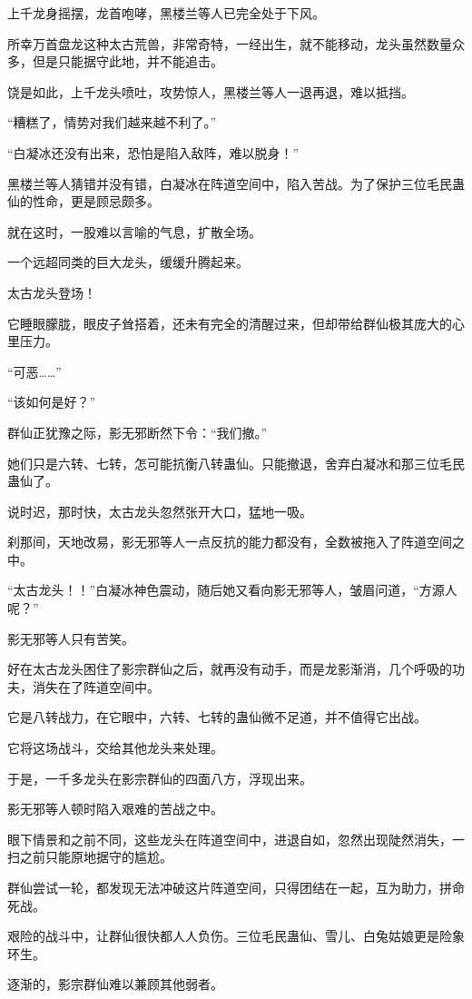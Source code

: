 \begin{this_body}
上千龙身摇摆，龙首咆哮，黑楼兰等人已完全处于下风。

所幸万首盘龙这种太古荒兽，非常奇特，一经出生，就不能移动，龙头虽然数量众多，但是只能据守此地，并不能追击。

饶是如此，上千龙头喷吐，攻势惊人，黑楼兰等人一退再退，难以抵挡。

“糟糕了，情势对我们越来越不利了。”

“白凝冰还没有出来，恐怕是陷入敌阵，难以脱身！”

黑楼兰等人猜错并没有错，白凝冰在阵道空间中，陷入苦战。为了保护三位毛民蛊仙的性命，更是顾忌颇多。

就在这时，一股难以言喻的气息，扩散全场。

一个远超同类的巨大龙头，缓缓升腾起来。

太古龙头登场！

它睡眼朦胧，眼皮子耸搭着，还未有完全的清醒过来，但却带给群仙极其庞大的心里压力。

“可恶……”

“该如何是好？”

群仙正犹豫之际，影无邪断然下令：“我们撤。”

她们只是六转、七转，怎可能抗衡八转蛊仙。只能撤退，舍弃白凝冰和那三位毛民蛊仙了。

说时迟，那时快，太古龙头忽然张开大口，猛地一吸。

刹那间，天地改易，影无邪等人一点反抗的能力都没有，全数被拖入了阵道空间之中。

“太古龙头！！”白凝冰神色震动，随后她又看向影无邪等人，皱眉问道，“方源人呢？”

影无邪等人只有苦笑。

好在太古龙头困住了影宗群仙之后，就再没有动手，而是龙影渐消，几个呼吸的功夫，消失在了阵道空间中。

它是八转战力，在它眼中，六转、七转的蛊仙微不足道，并不值得它出战。

它将这场战斗，交给其他龙头来处理。

于是，一千多龙头在影宗群仙的四面八方，浮现出来。

影无邪等人顿时陷入艰难的苦战之中。

眼下情景和之前不同，这些龙头在阵道空间中，进退自如，忽然出现陡然消失，一扫之前只能原地据守的尴尬。

群仙尝试一轮，都发现无法冲破这片阵道空间，只得团结在一起，互为助力，拼命死战。

艰险的战斗中，让群仙很快都人人负伤。三位毛民蛊仙、雪儿、白兔姑娘更是险象环生。

逐渐的，影宗群仙难以兼顾其他弱者。


\end{this_body}
